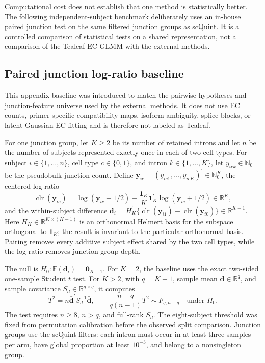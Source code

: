 \documentclass[11pt]{article}
\begin{document}
Computational cost does not establish that one method is statistically better. The following independent-subject benchmark deliberately uses an in-house paired junction test on the same filtered junction groups as scQuint. It is a controlled comparison of statistical tests on a shared representation, not a comparison of the Tealeaf EC GLMM with the external methods.

\subsection*{Paired junction log-ratio baseline}

This appendix baseline was introduced to match the pairwise hypotheses and junction-feature universe used by the external methods. It does not use EC counts, primer-specific compatibility maps, isoform ambiguity, splice blocks, or latent Gaussian EC fitting and is therefore not labeled as Tealeaf.

For one junction group, let \(K\geq2\) be its number of retained introns and let \(n\) be the number of subjects represented exactly once in each of two cell types. For subject \(i\in\{1,\ldots,n\}\), cell type \(c\in\{0,1\}\), and intron \(k\in\{1,\ldots,K\}\), let \(y_{ick}\in\mathbb N_0\) be the pseudobulk junction count. Define \(\bm y_{ic}=(y_{ic1},\ldots,y_{icK})^\prime\in\mathbb N_0^K\), the centered log-ratio \[
 \operatorname{clr}(\bm y_{ic})
 =\log(\bm y_{ic}+1/2)
  -\frac{\bm1_K}{K}\bm1_K^\prime\log(\bm y_{ic}+1/2)
 \in\mathbb R^K,
\]
and the within-subject difference \(\bm d_i=H_K^\prime\{\operatorname{clr}(\bm y_{i1})- \operatorname{clr}(\bm y_{i0})\}\in\mathbb R^{K-1}\). Here \(H_K\in\mathbb R^{K\times(K-1)}\) is an orthonormal Helmert basis for the subspace orthogonal to \(\bm1_K\); the result is invariant to the particular orthonormal basis. Pairing removes every additive subject effect shared by the two cell types, while the log-ratio removes junction-group depth.

The null is \(H_0:\mathbb E(\bm d_i)=\bm0_{K-1}\). For \(K=2\), the baseline uses the exact two-sided one-sample Student \(t\) test. For \(K>2\), with \(q=K-1\), sample mean \(\bar{\bm d}\in\mathbb R^q\), and sample covariance \(S_d\in\mathbb R^{q\times q}\), it computes \[
 T^2=n\bar{\bm d}^{\prime}S_d^{-1}\bar{\bm d},\qquad
 \frac{n-q}{q(n-1)}T^2\sim F_{q,n-q}\quad\text{under }H_0.
\]
The test requires \(n\geq8\), \(n>q\), and full-rank \(S_d\). The eight-subject threshold was fixed from permutation calibration before the observed split comparison. Junction groups use the scQuint filters: each intron must occur in at least three samples per arm, have global proportion at least \(10^{-3}\), and belong to a nonsingleton group.
\end{document}
